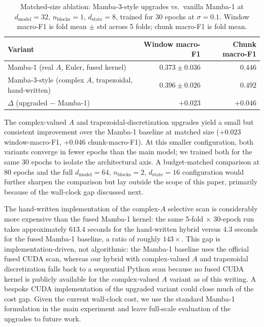 \documentclass{article}
\begin{document}
\begin{table}[htbp]
\centering
\caption{Matched-size ablation: Mamba-3-style upgrades vs.\ vanilla Mamba-1 at $d_\text{model} = 32$, $n_\text{blocks} = 1$, $d_\text{state} = 8$, trained for 30 epochs at $\sigma = 0.1$. Window macro-F1 is fold mean $\pm$ std across 5 folds; chunk macro-F1 is fold mean.}
\label{tab:ablation}
\begin{tabular}{l r r}
\toprule
Variant & Window macro-F1 & Chunk macro-F1 \\
\midrule
Mamba-1 (real $A$, Euler, fused kernel) & $0.373 \pm 0.036$ & $0.446$ \\
Mamba-3-style (complex $A$, trapezoidal, hand-written) & $0.396 \pm 0.026$ & $0.492$ \\
$\Delta$ (upgraded $-$ Mamba-1) & $+0.023$ & $+0.046$ \\
\bottomrule
\end{tabular}
\end{table}

The complex-valued $A$ and trapezoidal-discretization upgrades yield a small but consistent improvement over the Mamba-1 baseline at matched size ($+0.023$ window-macro-F1, $+0.046$ chunk-macro-F1). At this smaller configuration, both variants converge in fewer epochs than the main model; we trained both for the same 30 epochs to isolate the architectural axis. A budget-matched comparison at 80 epochs and the full $d_\text{model} = 64$, $n_\text{blocks} = 2$, $d_\text{state} = 16$ configuration would further sharpen the comparison but lay outside the scope of this paper, primarily because of the wall-clock gap discussed next.

The hand-written implementation of the complex-$A$ selective scan is considerably more expensive than the fused Mamba-1 kernel: the same 5-fold $\times$ 30-epoch run takes approximately $613.4$ seconds for the hand-written hybrid versus $4.3$ seconds for the fused Mamba-1 baseline, a ratio of roughly $143\times$. This gap is implementation-driven, not algorithmic: the Mamba-1 baseline uses the official fused CUDA scan, whereas our hybrid with complex-valued $A$ and trapezoidal discretization falls back to a sequential Python scan because no fused CUDA kernel is publicly available for the complex-valued $A$ variant as of this writing. A bespoke CUDA implementation of the upgraded variant could close much of the cost gap. Given the current wall-clock cost, we use the standard Mamba-1 formulation in the main experiment and leave full-scale evaluation of the upgrades to future work.
\end{document}
